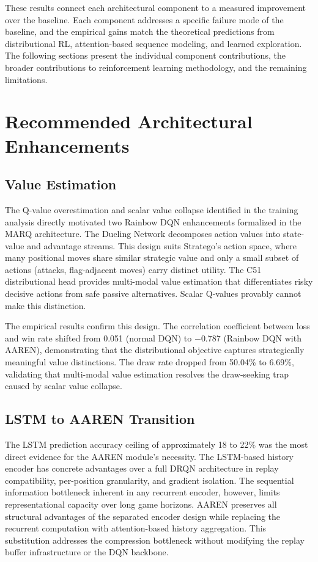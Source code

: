 These results connect each architectural component to a measured improvement over the baseline. Each component addresses a specific failure mode of the baseline, and the empirical gains match the theoretical predictions from distributional RL, attention-based sequence modeling, and learned exploration. The following sections present the individual component contributions, the broader contributions to reinforcement learning methodology, and the remaining limitations.

\section{Recommended Architectural Enhancements}

\subsection{Value Estimation}

The Q-value overestimation and scalar value collapse identified in the training analysis directly motivated two Rainbow DQN enhancements formalized in the MARQ architecture. The Dueling Network decomposes action values into state-value and advantage streams. This design suits Stratego's action space, where many positional moves share similar strategic value and only a small subset of actions (attacks, flag-adjacent moves) carry distinct utility. The C51 distributional head provides multi-modal value estimation that differentiates risky decisive actions from safe passive alternatives. Scalar Q-values provably cannot make this distinction.

The empirical results confirm this design. The correlation coefficient between loss and win rate shifted from 0.051 (normal DQN) to $-$0.787 (Rainbow DQN with AAREN), demonstrating that the distributional objective captures strategically meaningful value distinctions. The draw rate dropped from 50.04\% to 6.69\%, validating that multi-modal value estimation resolves the draw-seeking trap caused by scalar value collapse.

\subsection{LSTM to AAREN Transition}

The LSTM prediction accuracy ceiling of approximately 18 to 22\% was the most direct evidence for the AAREN module's necessity. The LSTM-based history encoder has concrete advantages over a full DRQN architecture in replay compatibility, per-position granularity, and gradient isolation. The sequential information bottleneck inherent in any recurrent encoder, however, limits representational capacity over long game horizons. AAREN preserves all structural advantages of the separated encoder design while replacing the recurrent computation with attention-based history aggregation. This substitution addresses the compression bottleneck without modifying the replay buffer infrastructure or the DQN backbone.

